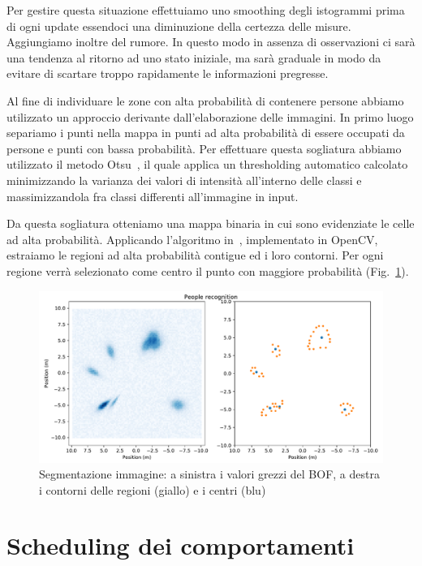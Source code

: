 \documentclass[a4paper]{article}
\begin{document}
	Per gestire questa situazione effettuiamo uno smoothing degli istogrammi
	prima di ogni update essendoci una diminuzione della certezza delle misure.
	Aggiungiamo inoltre del rumore. In questo modo in assenza di osservazioni
	ci sarà una tendenza al ritorno ad uno stato iniziale, ma sarà graduale in
	modo da evitare di scartare troppo rapidamente le informazioni pregresse.

	Al fine di individuare le zone con alta probabilità di contenere persone
	abbiamo utilizzato un approccio derivante dall'elaborazione delle immagini.
	In primo luogo separiamo i punti nella mappa in punti ad alta probabilità
	di essere occupati da persone e punti con bassa probabilità. Per effettuare
	questa sogliatura abbiamo utilizzato il metodo Otsu~\cite{otsu}, il quale
	applica un thresholding automatico calcolato minimizzando la varianza dei
	valori di intensità all'interno delle classi e massimizzandola fra classi
	differenti all'immagine in input.  
	
	Da questa sogliatura otteniamo una mappa binaria in cui sono evidenziate le
	celle ad alta probabilità. Applicando l'algoritmo in~\cite{contours},
	implementato in OpenCV, estraiamo le regioni ad alta probabilità contigue
	ed i loro contorni. Per ogni regione verrà selezionato come centro il punto
	con maggiore probabilità (Fig.~\ref{fig:image_segmentation}).

	\begin{figure}[H]
		\centering
		\includegraphics[width=1\textwidth]{./img/image_segmentation.pdf}
		\caption{Segmentazione immagine: a sinistra i valori grezzi del BOF, a destra i contorni delle regioni (giallo) e i centri (blu) }
		\label{fig:image_segmentation}
	\end{figure}

	\section{Scheduling dei comportamenti}\label{sec:Scheduling-dei-comportamenti}
	
\end{document}
